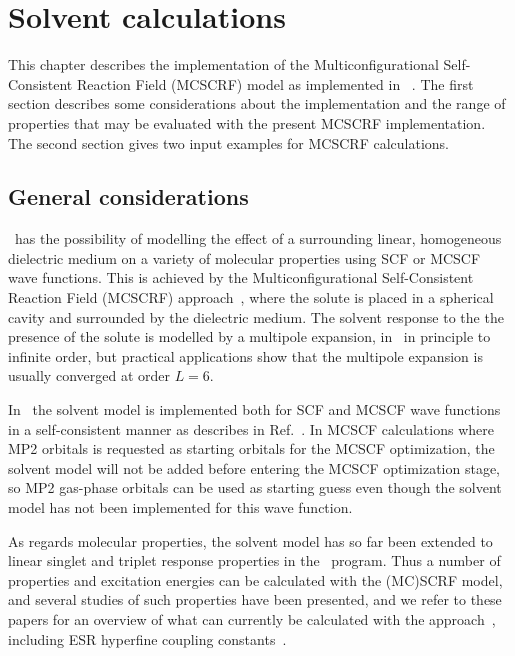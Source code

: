 \chapter{Solvent calculations}\label{ch:solvent}

This chapter describes the implementation of the
Multiconfigurational Self-Consistent Reaction Field (MCSCRF) model
as implemented in \siraba \ . The first section describes some
considerations about the implementation  and the range of
properties that may be evaluated with the present MCSCRF
implementation. The second section gives two input examples for
MCSCRF calculations.

\section{General considerations}\label{sec:solventimpl}

\siraba\ has the possibility of modelling the effect of a
surrounding linear, homogeneous dielectric medium on a variety of molecular properties using
SCF or MCSCF
wave functions. This is achieved by the Multiconfigurational
Self-Consistent Reaction Field (MCSCRF)
approach~\cite{kvmedpsjpc91,kvmhahjajthjcp89}, where the solute is
placed in a spherical cavity and surrounded by the
dielectric medium. The solvent response to the the presence of the
solute is modelled by a multipole expansion, in \siraba\ in principle to infinite order, but
practical applications show that the multipole expansion is
usually converged at order $L=6$.

In \siraba\ the solvent model is implemented both for SCF and MCSCF wave
functions in a self-consistent manner as describes in
Ref.~\cite{kvmedpsjpc91,kvmhahjajthjcp89}. In MCSCF calculations where
MP2 orbitals is requested as starting orbitals for the MCSCF
optimization, the solvent model will not be added before entering the
MCSCF optimization stage, so MP2 gas-phase orbitals can be used as
starting guess even though the solvent model has not been implemented
for this wave function.

As regards molecular properties, the solvent model has so far been
extended to linear singlet and triplet response
properties in the
\resp\ program. Thus a number of properties and excitation energies can
be calculated with the (MC)SCRF model, and several studies of such
properties have been presented, and we refer to these papers for an
overview of what can currently be calculated with the
approach~\cite{kvmpjhjajjcp100,kvmylhapjjcp100}, including ESR
hyperfine coupling constants~\cite{bfocobpjkvmjcp104}.

